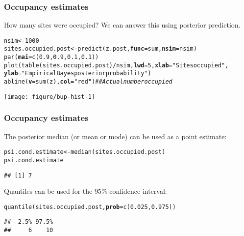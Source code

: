 \documentclass[color=usenames,dvipsnames]{beamer}\usepackage[]{graphicx}\usepackage[]{xcolor}
\makeatletter
\newcommand{\hlnum}[1]{\textcolor[rgb]{0.69,0.494,0}{#1}}%
\newcommand{\hlsng}[1]{\textcolor[rgb]{0.749,0.012,0.012}{#1}}%
\newcommand{\hlcom}[1]{\textcolor[rgb]{0.514,0.506,0.514}{\textit{#1}}}%
\newcommand{\hlopt}[1]{\textcolor[rgb]{0,0,0}{#1}}%
\newcommand{\hldef}[1]{\textcolor[rgb]{0,0,0}{#1}}%
\newcommand{\hlkwb}[1]{\textcolor[rgb]{0,0.341,0.682}{#1}}%
\newcommand{\hlkwc}[1]{\textcolor[rgb]{0,0,0}{\textbf{#1}}}%
\newcommand{\hlkwd}[1]{\textcolor[rgb]{0.004,0.004,0.506}{#1}}%
\newenvironment{kframe}{%
 \def\at@end@of@kframe{}%
 \ifinner\ifhmode%
  \def\at@end@of@kframe{\end{minipage}}%
  \begin{minipage}{\columnwidth}%
 \fi\fi%
 \def\FrameCommand##1{\hskip\@totalleftmargin \hskip-\fboxsep
 \colorbox{shadecolor}{##1}\hskip-\fboxsep
     \hskip-\linewidth \hskip-\@totalleftmargin \hskip\columnwidth}%
 \MakeFramed {\advance\hsize-\width
   \@totalleftmargin\z@ \linewidth\hsize
   \@setminipage}}%
 {\par\unskip\endMakeFramed%
 \at@end@of@kframe}
\newenvironment{knitrout}{}{} %
\makeatother
\begin{document}
\begin{frame}[fragile]
  \frametitle{Occupancy estimates}
  How many sites were occupied? \pause
  We can answer this using posterior prediction.
\begin{knitrout}\tiny
{}\color{fgcolor}\begin{kframe}
\begin{alltt}
\hldef{nsim} \hlkwb{<-} \hlnum{1000}
\hldef{sites.occupied.post} \hlkwb{<-} \hlkwd{predict}\hldef{(z.post,} \hlkwc{func}\hldef{=sum,} \hlkwc{nsim}\hldef{=nsim)}
\hlkwd{par}\hldef{(}\hlkwc{mai}\hldef{=}\hlkwd{c}\hldef{(}\hlnum{0.9}\hldef{,}\hlnum{0.9}\hldef{,}\hlnum{0.1}\hldef{,}\hlnum{0.1}\hldef{))}
\hlkwd{plot}\hldef{(}\hlkwd{table}\hldef{(sites.occupied.post)}\hlopt{/}\hldef{nsim,} \hlkwc{lwd}\hldef{=}\hlnum{5}\hldef{,} \hlkwc{xlab}\hldef{=}\hlsng{"Sites occupied"}\hldef{,}
    \hlkwc{ylab}\hldef{=}\hlsng{"Empirical Bayes posterior probability"}\hldef{)}
\hlkwd{abline}\hldef{(}\hlkwc{v}\hldef{=}\hlkwd{sum}\hldef{(z),} \hlkwc{col}\hldef{=}\hlsng{"red"}\hldef{)} \hlcom{## Actual number occupied}
\end{alltt}
\end{kframe}

{\centering \texttt{[image: figure/bup-hist-1]} 

}


\end{knitrout}
\end{frame}



\begin{frame}[fragile]
  \frametitle{Occupancy estimates}
  The posterior median (or mean or mode) can be used as a point estimate:
\begin{knitrout}
\color{fgcolor}\begin{kframe}
\begin{alltt}
\hldef{psi.cond.estimate} \hlkwb{<-} \hlkwd{median}\hldef{(sites.occupied.post)}
\hldef{psi.cond.estimate}
\end{alltt}
\begin{verbatim}
## [1] 7
\end{verbatim}
\end{kframe}
\end{knitrout}

\pause
\vfill
Quantiles can be used for the 95\% confidence interval:
\begin{knitrout}
\color{fgcolor}\begin{kframe}
\begin{alltt}
\hlkwd{quantile}\hldef{(sites.occupied.post,} \hlkwc{prob}\hldef{=}\hlkwd{c}\hldef{(}\hlnum{0.025}\hldef{,} \hlnum{0.975}\hldef{))}
\end{alltt}
\begin{verbatim}
##  2.5% 97.5% 
##     6    10
\end{verbatim}
\end{kframe}
\end{knitrout}
\end{frame}
\end{document}
